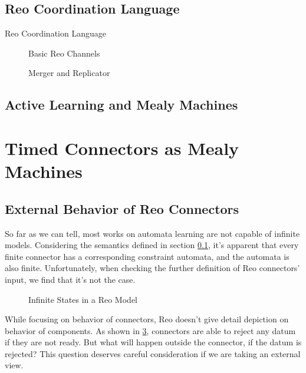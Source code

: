 \documentclass[conference, a4paper]{IEEEtran}
\begin{document}
\subsection{Reo Coordination Language}
\label{sec:reo}
Reo Coordination Language\cite{DBLP:journals/mscs/Arbab04}

\begin{figure}[h]
  \begin{center}
    
  \end{center}
  \caption{Basic Reo Channels}
  \label{fig:basic}
\end{figure}

\begin{figure}[h]
  \begin{center}
    
  \end{center}
  \caption{Merger and Replicator}
  \label{fig:reoextend}
\end{figure}

\subsection{Active Learning and Mealy Machines}

\section{Timed Connectors as Mealy Machines}

\subsection{External Behavior of Reo Connectors}
So far as we can tell, most
works\cite{DBLP:conf/fase/RaffeltS06, DBLP:journals/corr/ChenHLLTWW15} on automata learning are not
capable of infinite models.  Considering the semantics defined in section
\ref{sec:reo}, it's apparent that every finite connector has a corresponding constraint
automata, and the automata is also finite. Unfortunately, when checking the further definition of
Reo connectors' input, we find that it's not the case.


\begin{figure}[h]
  \caption{Infinite States in a Reo Model}
  \label{fig:reoinfinite}
\end{figure}

While focusing on behavior of connectors, Reo doesn't give detail depiction on behavior of
components. As shown in \figurename \ref{fig:reoinfinite}, connectors are able to reject any datum
if they are not ready. But what will happen outside the connector, if the datum is rejected? This
question deserves careful consideration if we are taking an external view.
\end{document}
